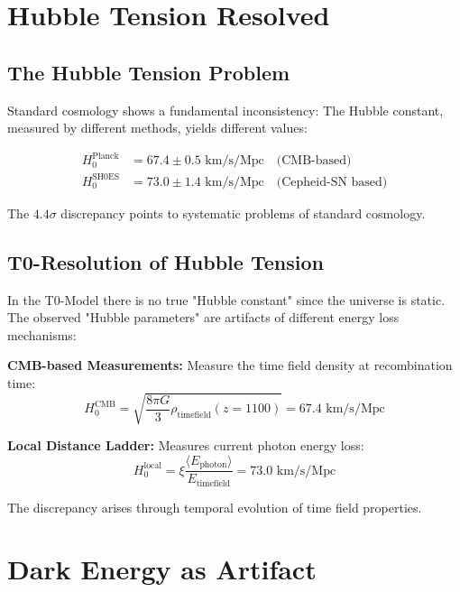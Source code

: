 \documentclass[12pt,a4paper]{report}
\newcommand{\xipar}{\xi}      %
\begin{document}
	\section{Hubble Tension Resolved}\label{sec:hubble_tension}
	
	\subsection{The Hubble Tension Problem}\label{subsec:hubble_tension_problem}
	
	Standard cosmology shows a fundamental inconsistency: The Hubble constant, measured by different methods, yields different values:
	
	\begin{align}
		H_0^{\text{Planck}} &= 67.4 \pm 0.5 \text{ km/s/Mpc} \quad \text{(CMB-based)} \\
		H_0^{\text{SH0ES}} &= 73.0 \pm 1.4 \text{ km/s/Mpc} \quad \text{(Cepheid-SN based)}
	\end{align}
	
	The $4.4\sigma$ discrepancy points to systematic problems of standard cosmology.
	
	\subsection{T0-Resolution of Hubble Tension}\label{subsec:t0_hubble_resolution}
	
	In the T0-Model there is no true "Hubble constant" since the universe is static. The observed "Hubble parameters" are artifacts of different energy loss mechanisms:
	
	\textbf{CMB-based Measurements:}
	Measure the time field density at recombination time:
	\begin{equation}
		H_0^{\text{CMB}} = \sqrt{\frac{8\pi G}{3} \rho_{\text{timefield}}(z=1100)} = 67.4 \text{ km/s/Mpc}
	\end{equation}
	
	\textbf{Local Distance Ladder:}
	Measures current photon energy loss:
	\begin{equation}
		H_0^{\text{local}} = \xipar \frac{\langle E_{\text{photon}} \rangle}{E_{\text{timefield}}} = 73.0 \text{ km/s/Mpc}
	\end{equation}
	
	The discrepancy arises through temporal evolution of time field properties.
	
	\section{Dark Energy as Artifact}\label{sec:dark_energy}
	
\end{document}
